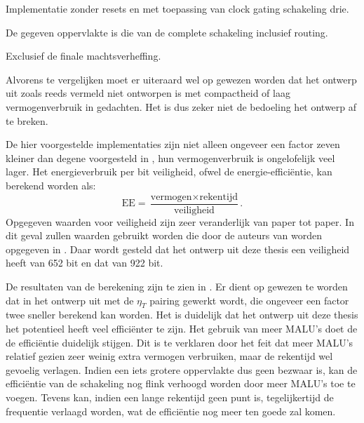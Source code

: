 \begin{table}[h]
	\footnotesize \footnotemark[2] Implementatie zonder resets en met toepassing van clock gating schakeling drie.
	
	\footnotemark[3] De gegeven oppervlakte is die van de complete schakeling inclusief routing.
	
	\footnotemark[4] Exclusief de finale machtsverheffing.
	
\end{table}

Alvorens te vergelijken moet er uiteraard wel op gewezen worden dat het ontwerp uit \cite{beuchat-asic} zoals reeds vermeld niet ontworpen is met compactheid of laag vermogenverbruik in gedachten. Het is dus zeker niet de bedoeling het ontwerp af te breken. 

De hier voorgestelde implementaties zijn niet alleen ongeveer een factor zeven kleiner dan degene voorgesteld in \cite{beuchat-asic}, hun vermogenverbruik is ongelofelijk veel lager. Het energieverbruik per bit veiligheid, ofwel de energie-effici\"entie, kan berekend worden als:
\[\text{EE} = \frac{\text{vermogen} \times \text{rekentijd}}{\text{veiligheid}}.\]
Opgegeven waarden voor veiligheid zijn zeer veranderlijk van paper tot paper. In dit geval zullen waarden gebruikt worden die door de auteurs van \cite{beuchat-asic} worden opgegeven in \cite{beuchat}. Daar wordt gesteld dat het ontwerp uit deze thesis een veiligheid heeft van 652 bit en dat van \cite{beuchat-asic} 922 bit.

De resultaten van de berekening zijn te zien in . Er dient op gewezen te worden dat in het ontwerp uit \cite{beuchat-asic} met de $\eta_T$ pairing gewerkt wordt, die ongeveer een factor twee sneller berekend kan worden. Het is duidelijk dat het ontwerp uit deze thesis het potentieel heeft veel effici\"enter te zijn. Het gebruik van meer MALU's doet de de effici\"entie duidelijk stijgen. Dit is te verklaren door het feit dat meer MALU's relatief gezien zeer weinig extra vermogen verbruiken, maar de rekentijd wel gevoelig verlagen. Indien een iets grotere oppervlakte dus geen bezwaar is, kan de effici\"entie van de schakeling nog flink verhoogd worden door meer MALU's toe te voegen. Tevens kan, indien een lange rekentijd geen punt is, tegelijkertijd de frequentie verlaagd worden, wat de effici\"entie nog meer ten goede zal komen. 

